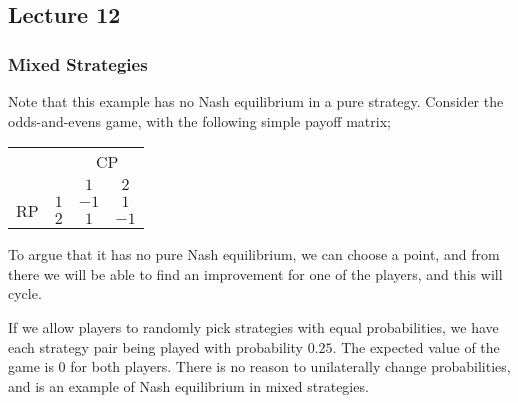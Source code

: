 \documentclass[a4paper, 12pt]{article}
\begin{document}
        \subsection*{Lecture 12}
            \subsubsection*{Mixed Strategies}
                Note that this example has no Nash equilibrium in a pure strategy.
                Consider the odds-and-evens game, with the following simple payoff matrix;
                \begin{center}
                    \begin{tabular}{|cc|cc|}
                        \hline
                        & & \multicolumn{2}{c|}{CP} \\
                        & & $1$ & $2$ \\
                        \hline
                        \multirow{2}{*}{RP} & $1$ & $-1$ & $1$ \\
                        & $2$ & $1$ & $-1$ \\
                        \hline
                    \end{tabular}
                \end{center}
                To argue that it has no pure Nash equilibrium, we can choose a point, and from there we will be able to find an improvement for one of the players, and this will cycle.
                \medskip

                If we allow players to randomly pick strategies with equal probabilities, we have each strategy pair being played with probability $0.25$.
                The expected value of the game is 0 for both players.
                There is no reason to unilaterally change probabilities, and is an example of Nash equilibrium in mixed strategies.
                \medskip
\end{document}
